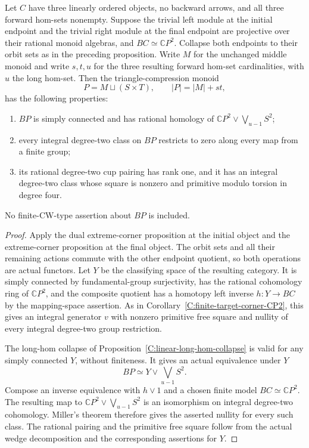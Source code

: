 \begin{corollary}
\label{C:finite-target-semisimple-endpoints}
Let $C$ have three linearly ordered objects, no backward arrows,
and all three forward hom-sets nonempty. Suppose the trivial left
module at the initial endpoint and the trivial right module at the
final endpoint are projective over their rational monoid algebras,
and $BC\simeq\mathbb CP^2$. Collapse both endpoints to their orbit
sets as in the preceding proposition. Write $M$ for the unchanged
middle monoid and write $s,t,u$ for the three resulting forward
hom-set cardinalities, with $u$ the long hom-set.
Then the triangle-compression monoid
\[
 P=M\sqcup(S\times T),\qquad |P|=|M|+st,
\]
has the following properties:
\begin{enumerate}
\item $BP$ is simply connected and has rational homology of
$\mathbb CP^2\vee\bigvee_{u-1}S^2$;
\item every integral degree-two class on $BP$ restricts to zero
along every map from a finite group;
\item its rational degree-two cup pairing has rank one, and it
has an integral degree-two class whose square is nonzero and
primitive modulo torsion in degree four.
\end{enumerate}
No finite-CW-type assertion about $BP$ is included.
\end{corollary}
\begin{proof}
Apply the dual extreme-corner proposition at the initial object
and the extreme-corner proposition at the final object. The orbit
sets and all their remaining actions commute with the other
endpoint quotient, so both operations are actual functors.
Let $Y$ be the classifying space of the resulting category.
It is simply connected by fundamental-group surjectivity, has
the rational cohomology ring of $\mathbb CP^2$, and the composite
quotient has a homotopy left inverse $h:Y\to BC$ by the
mapping-space assertion. As in
Corollary~\ref{C:finite-target-corner-CP2}, this gives an integral
generator $v$ with nonzero primitive free square and nullity of
every integral degree-two group restriction.

The long-hom collapse of
Proposition~\ref{C:linear-long-hom-collapse} is valid for any
simply connected $Y$, without finiteness. It gives an actual
equivalence under $Y$
\[
 BP\simeq Y\vee\bigvee_{u-1}S^2.
\]
Compose an inverse equivalence with
$h\vee1$ and a chosen finite model
$BC\simeq\mathbb CP^2$. The resulting map to
$\mathbb CP^2\vee\bigvee_{u-1}S^2$ is an isomorphism on
integral degree-two cohomology. Miller's theorem therefore gives
the asserted nullity for every such class. The rational pairing
and the primitive free square follow from the actual wedge
decomposition and the corresponding assertions for $Y$.
\end{proof}

